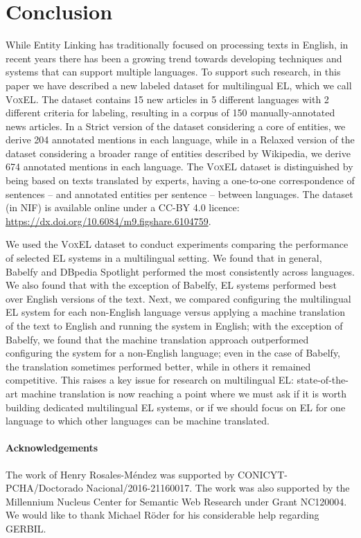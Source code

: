 \documentclass{llncs}
\begin{document}
\section{Conclusion}
\label{sec:conclusion}

While Entity Linking has traditionally focused on processing texts in English, in recent years there has been a growing trend towards developing techniques and systems that can support multiple languages. To support such research, in this paper we have described a new labeled dataset for multilingual EL, which we call \textsc{VoxEL}. The dataset contains 15 new articles in 5 different languages with 2 different criteria for labeling, resulting in a corpus of 150 manually-annotated news articles. In a Strict version of the dataset considering a core of entities, we derive 204 annotated mentions in each language, while in a Relaxed version of the dataset considering a broader range of entities described by Wikipedia, we derive 674 annotated mentions in each language. The \textsc{VoxEL} dataset is distinguished by being based on texts translated by experts, having a one-to-one correspondence of sentences -- and annotated entities per sentence -- between languages. The dataset (in NIF) is available online under a CC-BY 4.0 licence: \url{https://dx.doi.org/10.6084/m9.figshare.6104759}.

We used the \textsc{VoxEL} dataset to conduct experiments comparing the performance of selected EL systems in a multilingual setting. We found that in general, Babelfy and DBpedia Spotlight performed the most consistently across languages. We also found that with the exception of Babelfy, EL systems performed best over English versions of the text. Next, we compared configuring the multilingual EL system for each non-English language versus applying a machine translation of the text to English and running the system in English; with the exception of Babelfy, we found that the machine translation approach outperformed configuring the system for a non-English language; even in the case of Babelfy, the translation sometimes performed better, while in others it remained competitive. This raises a key issue for research on multilingual EL: state-of-the-art machine translation is now reaching a point where we must ask if it is worth building dedicated multilingual EL systems, or if we should focus on EL for one language to which other languages can be machine translated. 


{\footnotesize
\paragraph{Acknowledgements} The work of Henry Rosales-M\'endez was supported by CONICYT-PCHA/Doctorado Nacional/2016-21160017. The work was also supported by the Millennium Nucleus Center for Semantic Web Research under Grant NC120004. We would like to thank Michael R\"oder for his considerable help regarding GERBIL.}
\end{document}
